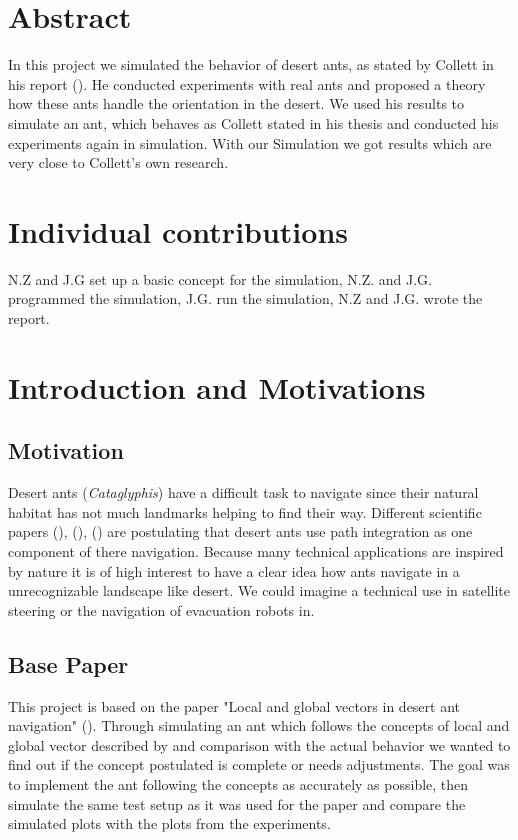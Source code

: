 \documentclass[11pt]{article}
\begin{document}
\newpage




\section{Abstract} %
	In this project we simulated the behavior of desert ants, as stated by Collett in his report (\cite{wehner}). He conducted experiments with real ants and proposed a theory how these ants handle the orientation in the desert. We used his results to simulate an ant, which behaves as Collett stated in his thesis and conducted his experiments again in simulation. With our Simulation we got results which are very close to Collett's own research.
\newpage

\section{Individual contributions} %
	N.Z and J.G set up a basic concept for the simulation, N.Z. and J.G. programmed the simulation, J.G. run the simulation, N.Z and J.G. wrote the report.

\section{Introduction and Motivations} %
	\subsection{Motivation}
		Desert ants (\textit{Cataglyphis}) have a difficult task to navigate since their natural habitat has not much landmarks helping to find their way. Different scientific papers (\cite{mueller}), (\cite{wehner}), (\cite{knaden}) are postulating that desert ants use path integration as one component of there navigation. Because many technical applications are inspired by nature it is of high interest to have a clear idea how ants navigate in a unrecognizable landscape like desert. We could imagine a technical use in satellite steering or the navigation of evacuation robots in.
	\subsection{Base Paper}
		This project is based on the paper "Local and global vectors in desert ant navigation" (\cite{wehner}). Through simulating an ant which follows the concepts of local and global vector described by \cite{wehner} and comparison with the actual behavior we wanted to find out if the concept postulated is complete or needs  adjustments. The goal was to implement the ant following the concepts as accurately as possible, then simulate the same test setup as it was used for the paper and compare the simulated plots with the plots from the experiments. 
\end{document}
